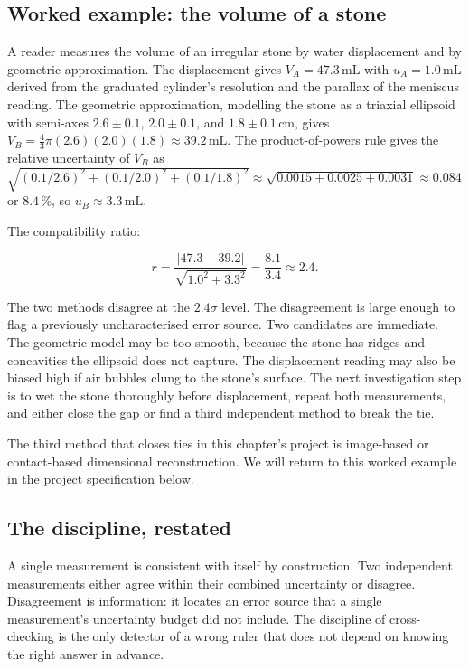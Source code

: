 \subsection{Worked example: the volume of a stone}

A reader measures the volume of an irregular stone by water
displacement and by geometric approximation. The displacement gives
$V_{A} = 47.3 \,\si{\milli\liter}$ with $u_{A} = 1.0 \,\si{\milli
\liter}$ derived from the graduated cylinder's resolution and the
parallax of the meniscus reading. The geometric approximation,
modelling the stone as a triaxial ellipsoid with semi-axes
$2.6 \pm 0.1$, $2.0 \pm 0.1$, and $1.8 \pm 0.1 \,\si{\centi\meter}$,
gives $V_{B} = \tfrac{4}{3}\pi(2.6)(2.0)(1.8) \approx 39.2 \,\si
{\milli\liter}$. The product-of-powers rule gives the relative
uncertainty of $V_{B}$ as $\sqrt{(0.1/2.6)^{2} + (0.1/2.0)^{2} +
(0.1/1.8)^{2}} \approx \sqrt{0.0015 + 0.0025 + 0.0031} \approx 0.084$
or $8.4\,\%$, so $u_{B} \approx 3.3 \,\si{\milli\liter}$.

The compatibility ratio:

\[
r = \frac{|47.3 - 39.2|}{\sqrt{1.0^{2} + 3.3^{2}}} =
\frac{8.1}{3.4} \approx 2.4.
\]

The two methods disagree at the $2.4\sigma$ level. The disagreement
is large enough to flag a previously uncharacterised error source.
Two candidates are immediate. The geometric model may be too smooth,
because the stone has ridges and concavities the ellipsoid does not
capture. The displacement reading may also be biased high if air
bubbles clung to the stone's surface. The next investigation step
is to wet the stone thoroughly
before displacement, repeat both measurements, and either close the
gap or find a third independent method to break the tie.

The third method that closes ties in this chapter's project is
image-based or contact-based dimensional reconstruction. We will
return to this worked example in the project specification below.

\subsection{The discipline, restated}

\begin{principle}
A single measurement is consistent with itself by construction. Two
independent measurements either agree within their combined
uncertainty or disagree. Disagreement is information: it locates an
error source that a single measurement's uncertainty budget did not
include. The discipline of cross-checking is the only detector of a
wrong ruler that does not depend on knowing the right answer in
advance.
\end{principle}

